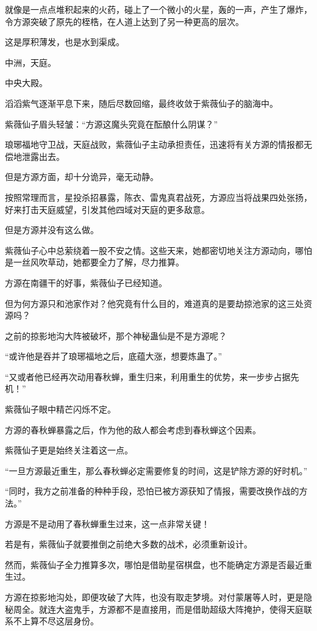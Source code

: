 \begin{this_body}
就像是一点点堆积起来的火药，碰上了一个微小的火星，轰的一声，产生了爆炸，令方源突破了原先的桎梏，在人道上达到了另一种更高的层次。

这是厚积薄发，也是水到渠成。

中洲，天庭。

中央大殿。

滔滔紫气逐渐平息下来，随后尽数回缩，最终收敛于紫薇仙子的脑海中。

紫薇仙子眉头轻皱：“方源这魔头究竟在酝酿什么阴谋？”

琅琊福地守卫战，天庭战败，紫薇仙子主动承担责任，迅速将有关方源的情报都无偿地泄露出去。

但是方源方面，却十分诡异，毫无动静。

按照常理而言，星投杀招暴露，陈衣、雷鬼真君战死，方源应当将战果四处张扬，好来打击天庭威望，引发其他四域对天庭的更多敌意。

但是方源并没有这么做。

紫薇仙子心中总萦绕着一股不安之情。这些天来，她都密切地关注方源动向，哪怕是一丝风吹草动，她都要全力了解，尽力推算。

方源在南疆干的好事，紫薇仙子已经知道。

但为何方源只和池家作对？他究竟有什么目的，难道真的是要劫掠池家的这三处资源吗？

之前的掠影地沟大阵被破坏，那个神秘蛊仙是不是方源呢？

“或许他是吞并了琅琊福地之后，底蕴大涨，想要炼蛊了。”

“又或者他已经再次动用春秋蝉，重生归来，利用重生的优势，来一步步占据先机！”

紫薇仙子眼中精芒闪烁不定。

方源的春秋蝉暴露之后，作为他的敌人都会考虑到春秋蝉这个因素。

紫薇仙子更是始终关注着这一点。

“一旦方源最近重生，那么春秋蝉必定需要修复的时间，这是铲除方源的好时机。”

“同时，我方之前准备的种种手段，恐怕已被方源获知了情报，需要改换作战的方法。”

方源是不是动用了春秋蝉重生过来，这一点非常关键！

若是有，紫薇仙子就要推倒之前绝大多数的战术，必须重新设计。

然而，紫薇仙子全力推算多次，哪怕是借助星宿棋盘，也不能确定方源是否最近重生过。

方源在掠影地沟处，即便攻破了大阵，也没有取走梦境。对付蒙屠等人时，更是隐秘周全。就连大盗鬼手，方源都不是直接用，而是借助超级大阵掩护，使得天庭联系不上算不尽这层身份。


\end{this_body}
